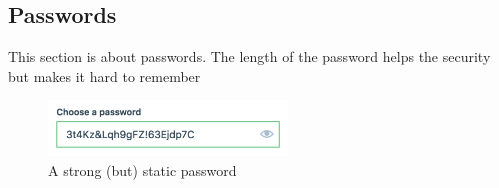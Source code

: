 \subsection{Passwords}
This section is about passwords.  
The length of the password helps the security but makes it hard to remember
\begin{figure}[h]
\centering
\includegraphics[width=2.5in]{password.png}
\caption{A strong (but) static password}
\end{figure}
